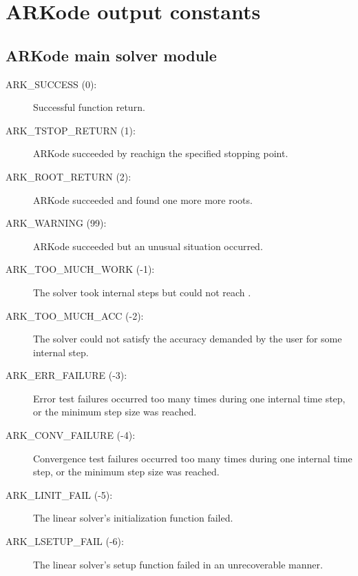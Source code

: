 \documentclass[letterpaper,10pt,english]{sphinxmanual}
\begin{document}
\section{ARKode output constants}
\label{Constants:arkode-output-constants}

\subsection{ARKode main solver module}
\label{Constants:id1}\begin{description}
\item[{ARK\_SUCCESS  (0):}] \leavevmode
Successful function return.

\item[{ARK\_TSTOP\_RETURN  (1):}] \leavevmode
ARKode succeeded by reachign the specified
stopping point.

\item[{ARK\_ROOT\_RETURN  (2):}] \leavevmode
ARKode succeeded and found one more more roots.

\item[{ARK\_WARNING  (99):}] \leavevmode
ARKode succeeded but an unusual situation occurred.

\item[{ARK\_TOO\_MUCH\_WORK  (-1):}] \leavevmode
The solver took  internal steps
but could not reach .

\item[{ARK\_TOO\_MUCH\_ACC  (-2):}] \leavevmode
The solver could not satisfy the accuracy
demanded by the user for some internal step.

\item[{ARK\_ERR\_FAILURE  (-3):}] \leavevmode
Error test failures occurred too many times
during one internal time step, or the minimum step size was
reached.

\item[{ARK\_CONV\_FAILURE  (-4):}] \leavevmode
Convergence test failures occurred too many
times during one internal time step, or the minimum step size was
reached.

\item[{ARK\_LINIT\_FAIL  (-5):}] \leavevmode
The linear solver's initialization function failed.

\item[{ARK\_LSETUP\_FAIL  (-6):}] \leavevmode
The linear solver's setup function failed in
an unrecoverable manner.


\end{description}
\end{document}
